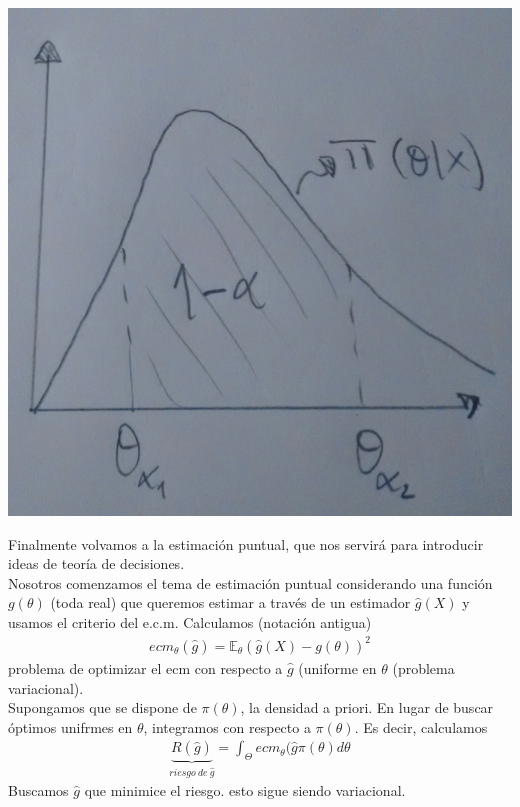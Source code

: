 \documentclass[10pt]{article}
\theoremstyle{plain}
\theoremstyle{definition}
\begin{document}
\begin{etaremune}
\begin{center}
\includegraphics[scale=0.1]{imagenes/credibilidad.jpg}
\end{center}
\item Finalmente volvamos a la estimación puntual, que nos servirá para introducir ideas de teoría de decisiones.\\

Nosotros comenzamos el tema de estimación puntual considerando una función $g(\theta)$ (toda real) que queremos estimar a través de un estimador $\hat{g}(X)$ y usamos el criterio del e.c.m. Calculamos (notación  antigua)
\begin{align*}
ecm_{\theta}(\hat{g}) = \mathbb{E}_{\theta}(\hat{g}(X)-g(\theta))^2
\end{align*}
problema de optimizar el ecm con respecto a $\hat{g}$ (uniforme en $\theta$ (problema variacional).\\

Supongamos que se dispone de $\pi(\theta)$, la densidad a priori. En lugar de buscar óptimos unifrmes en $\theta$, integramos con respecto a $\pi(\theta)$. Es decir, calculamos
\begin{align*}
\underbrace{R(\hat{g})}_{riesgo\ de\ \hat{g}} = \int_{\Theta}ecm_{\theta}(\hat{g}\pi(\theta)d\theta
\end{align*}
Buscamos $\hat{g}$ que minimice el riesgo. esto sigue siendo variacional.\\


\end{etaremune}
\end{document}
